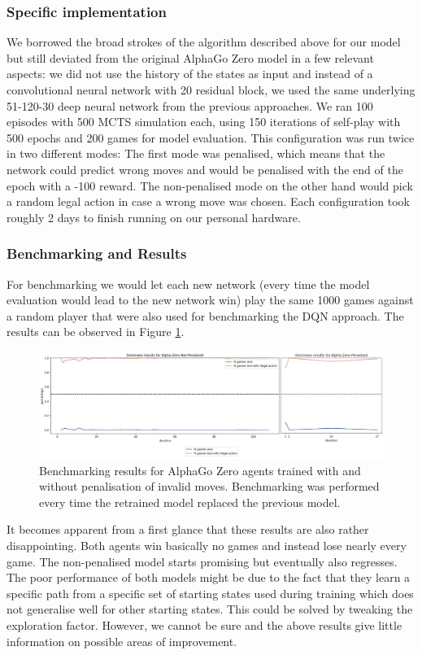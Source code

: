 \documentclass[12pt,a4paper]{article}
\begin{document}
{\subsubsection{Specific implementation}
We borrowed the broad strokes of the algorithm described above for our model but still deviated from the original AlphaGo Zero model in a few relevant aspects: we did not use the history of the states as input and instead of a convolutional neural network with 20 residual block, we used the same underlying 51-120-30 deep neural network from the previous approaches. We ran 100 episodes with 500 MCTS simulation each, using 150 iterations of self-play with 500 epochs and 200 games for model evaluation. This configuration was run twice in two different modes: The first mode was penalised, which means that the network could predict wrong moves and would be penalised with the end of the epoch with a -100 reward. The non-penalised mode on the other hand would pick a random legal action in case a wrong move was chosen. Each configuration took roughly 2 days to finish running on our personal hardware.

\subsubsection{Benchmarking and Results}
For benchmarking we would let each new network (every time the model evaluation would lead to the new network win) play the same 1000 games against a random player that were also used for benchmarking the DQN approach. The results can be observed in Figure \ref{fig:alphazero}.

\begin{figure}
  \includegraphics[width=\linewidth]{img/alphazero.png}
  \centering 
  \caption{Benchmarking results for AlphaGo Zero agents trained with and without penalisation of invalid moves. Benchmarking was performed every time the retrained model replaced the previous model.}
  \label{fig:alphazero}
\end{figure}

It becomes apparent from a first glance that these results are also rather disappointing. Both agents win basically no games and instead lose nearly every game. The non-penalised model starts promising but eventually also regresses. The poor performance of both models might be due to the fact that they learn a specific path from a specific set of starting states used during training which does not generalise well for other starting states. This could be solved by tweaking the exploration factor. However, we cannot be sure and the above results give little information on possible areas of improvement.

}
\end{document}
